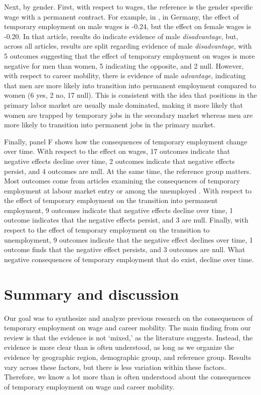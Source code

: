 \documentclass[12pt]{article}
\begin{document}
Next, by gender.  First, with respect to wages, the reference is the gender specific wage with a permanent contract.  For example, in \citealp[Table 2]{gebel_2010}, in Germany, the effect of temporary employment on male wages is -0.24, but the effect on female wages is -0.20.  In that article, results do indicate evidence of male \emph{disadvantage}, but, across all articles, results are split regarding evidence of male \emph{disadvantage}, with 5 outcomes suggesting that the effect of temporary employment on wages is more negative for men than women, 5 indicating the opposite, and 2 null.  However, with respect to career mobility, there is evidence of male \emph{advantage}, indicating that men are more likely into transition into permanent employment compared to women (6 yes, 2 no, 17 null).  This is consistent with the idea that positions in the primary labor market are usually male dominated, making it more likely that women are trapped by temporary jobs in the secondary market whereas men are more likely to transition into permanent jobs in the primary market.  

Finally, panel F shows how the consequences of temporary employment change over time.  With respect to the effect on wages, 17 outcomes indicate that negative effects decline over time, 2 outcomes indicate that negative effects persist, and 4 outcomes are null.  At the same time, the reference group matters.  Most outcomes come from articles examining the consequences of temporary employment at labour market entry \citep{gebel_2010,pavlopoulos_2013,de_lange_etal_2014} or among the unemployed \citep{gebel_2013}.  With respect to the effect of temporary employment on the transition into permanent employment, 9 outcomes indicate that negative effects decline over time, 1 outcome indicates that the negative effects persist, and 3 are null.  Finally, with respect to the effect of temporary employment on the transition to unemployment, 9 outcomes indicate that the negative effect declines over time, 1 outcome finds that the negative effect persists, and 3 outcomes are null.  What negative consequences of temporary employment that do exist, decline over time.

\section{Summary and discussion}

Our goal was to synthesize and analyze previous research on the consequences of temporary employment on wage and career mobility.  The main finding from our review is that the evidence is not `mixed,' as the literature suggests.  Instead, the evidence is more clear than is often understood, as long as we organize the evidence by geographic region, demographic group, and reference group.  Results vary across these factors, but there is less variation within these factors.  Therefore, we know a lot more than is often understood about the consequences of temporary employment on wage and career mobility.  
\end{document}
